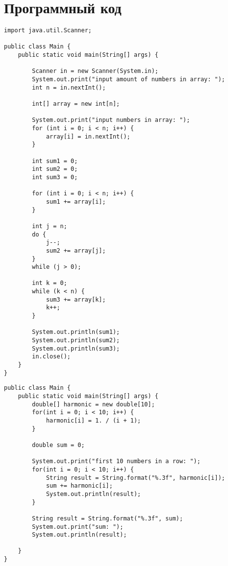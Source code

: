 \documentclass[14pt, a4paper]{extarticle}
\newenvironment{code}{\captionsetup{type=listing}}{}
\begin{document}
\section*{Программный код}
\begin{code}
\begin{Verbatim}[frame=single, fontsize=\footnotesize]
import java.util.Scanner;

public class Main {
    public static void main(String[] args) {

        Scanner in = new Scanner(System.in);
        System.out.print("input amount of numbers in array: ");
        int n = in.nextInt();

        int[] array = new int[n];

        System.out.print("input numbers in array: ");
        for (int i = 0; i < n; i++) {
            array[i] = in.nextInt();
        }

        int sum1 = 0;
        int sum2 = 0;
        int sum3 = 0;

        for (int i = 0; i < n; i++) {
            sum1 += array[i];
        }

        int j = n;
        do {
            j--;
            sum2 += array[j];
        }
        while (j > 0);

        int k = 0;
        while (k < n) {
            sum3 += array[k];
            k++;
        }

        System.out.println(sum1);
        System.out.println(sum2);
        System.out.println(sum3);
        in.close();
    }
}
\end{Verbatim}
\end{code}
\begin{code}
\begin{Verbatim}[frame=single, fontsize=\footnotesize]
public class Main {
    public static void main(String[] args) {
        double[] harmonic = new double[10];
        for(int i = 0; i < 10; i++) {
            harmonic[i] = 1. / (i + 1);
        }

        double sum = 0;

        System.out.print("first 10 numbers in a row: ");
        for(int i = 0; i < 10; i++) {
            String result = String.format("%.3f", harmonic[i]);
            sum += harmonic[i];
            System.out.println(result);
        }

        String result = String.format("%.3f", sum);
        System.out.print("sum: ");
        System.out.println(result);

    }
}
\end{Verbatim}
\end{code}
\end{document}
